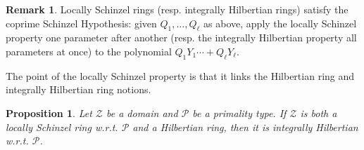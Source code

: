 \documentclass[11pt,a4paper,reqno]{amsart}
\newcommand\AB[1] {\textcolor{red}{{#1}}}
\newtheorem{prop}[thm]{Proposition}
\theoremstyle{definition}
\newtheorem{rmk}[thm]{Remark}
\begin{document}
\begin{rmk}


\vskip 1mm

\noindent
Locally Schinzel rings (\hbox{resp.} integrally Hilbertian rings) satisfy the coprime Schinzel Hypothesis: given $Q_1,\ldots,Q_\ell$ as above, apply the locally Schinzel property one parameter after another (\hbox{resp.} the integrally Hilbertian property all parameters at once) to the polynomial $Q_1Y_1\cdots + Q_\ell Y_\ell$.  
\end{rmk}

The point of the locally Schinzel property is that it links the Hilbertian ring and integrally Hilbertian ring notions. 

\begin{prop} \label{prop:schinzel+Hil=intH}
Let ${\mathcal Z}$ be a domain 
and  ${\mathcal P}$ be a primality type. 
If ${\mathcal Z}$ is both a locally Schinzel ring \hbox{w.r.t.} ${\mathcal P}$ and a Hilbertian ring, then it is integrally Hilbertian \hbox{w.r.t.} ${\mathcal P}$. 
\end{prop}

\end{document}

